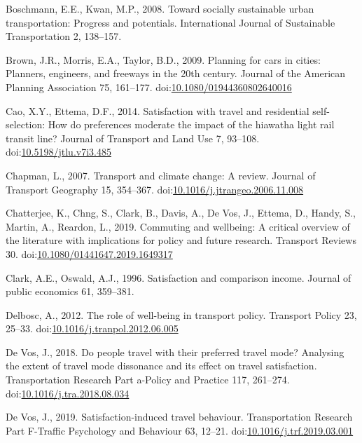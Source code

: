 \documentclass[]{elsarticle} %
\begin{document}
\leavevmode\hypertarget{ref-Boschman2008toward}{}%
Boschmann, E.E., Kwan, M.P., 2008. Toward socially sustainable urban
transportation: Progress and potentials. International Journal of
Sustainable Transportation 2, 138--157.

\leavevmode\hypertarget{ref-Brown2009planning}{}%
Brown, J.R., Morris, E.A., Taylor, B.D., 2009. Planning for cars in
cities: Planners, engineers, and freeways in the 20th century. Journal
of the American Planning Association 75, 161--177.
doi:\href{https://doi.org/10.1080/01944360802640016}{10.1080/01944360802640016}

\leavevmode\hypertarget{ref-Cao2014satisfaction}{}%
Cao, X.Y., Ettema, D.F., 2014. Satisfaction with travel and residential
self-selection: How do preferences moderate the impact of the hiawatha
light rail transit line? Journal of Transport and Land Use 7, 93--108.
doi:\href{https://doi.org/10.5198/jtlu.v7i3.485}{10.5198/jtlu.v7i3.485}

\leavevmode\hypertarget{ref-Chapman2007transport}{}%
Chapman, L., 2007. Transport and climate change: A review. Journal of
Transport Geography 15, 354--367.
doi:\href{https://doi.org/10.1016/j.jtrangeo.2006.11.008}{10.1016/j.jtrangeo.2006.11.008}

\leavevmode\hypertarget{ref-Chatterjee2019commuting}{}%
Chatterjee, K., Chng, S., Clark, B., Davis, A., De Vos, J., Ettema, D.,
Handy, S., Martin, A., Reardon, L., 2019. Commuting and wellbeing: A
critical overview of the literature with implications for policy and
future research. Transport Reviews 30.
doi:\href{https://doi.org/10.1080/01441647.2019.1649317}{10.1080/01441647.2019.1649317}

\leavevmode\hypertarget{ref-Clark1996satisfaction}{}%
Clark, A.E., Oswald, A.J., 1996. Satisfaction and comparison income.
Journal of public economics 61, 359--381.

\leavevmode\hypertarget{ref-Delbosc2012role}{}%
Delbosc, A., 2012. The role of well-being in transport policy. Transport
Policy 23, 25--33.
doi:\href{https://doi.org/10.1016/j.tranpol.2012.06.005}{10.1016/j.tranpol.2012.06.005}

\leavevmode\hypertarget{ref-Devos2018people}{}%
De Vos, J., 2018. Do people travel with their preferred travel mode?
Analysing the extent of travel mode dissonance and its effect on travel
satisfaction. Transportation Research Part a-Policy and Practice 117,
261--274.
doi:\href{https://doi.org/10.1016/j.tra.2018.08.034}{10.1016/j.tra.2018.08.034}

\leavevmode\hypertarget{ref-Devos2019satisfaction}{}%
De Vos, J., 2019. Satisfaction-induced travel behaviour. Transportation
Research Part F-Traffic Psychology and Behaviour 63, 12--21.
doi:\href{https://doi.org/10.1016/j.trf.2019.03.001}{10.1016/j.trf.2019.03.001}
\end{document}
